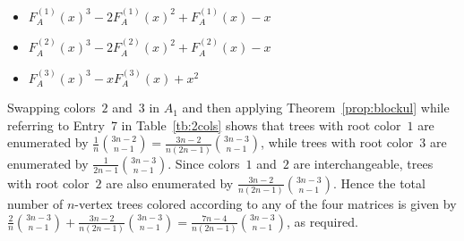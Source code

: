 \documentclass[12pt]{amsart}
\newcommand{\gff}[2]{F_{#2}^{(#1)}(x)}
\newcommand{\gfa}[1]{\gff{#1}{A}}
\begin{document}
\begin{description}
    \begin{itemize}
\item $\gfa{1}^3-2\gfa{1}^2+\gfa{1}-x$


\item $\gfa{2}^3-2\gfa{2}^2+\gfa{2}-x$


\item $\gfa{3}^3-x\gfa{3}+x^2$


\end{itemize}
    \item[Discussion] 
    Swapping colors~$2$ and~$3$ in $A_1$ and then applying Theorem~\ref{prop:blockul} while referring to Entry~7 in Table~\ref{tb:2cols} shows 
    that trees with root color~$1$ are enumerated by $\frac{1}{n}\binom{3n-2}{n-1}=\frac{3n-2}{n(2n-1)}\binom{3n-3}{n-1}$, while trees with root color~$3$ are enumerated by $\frac{1}{2n-1}\binom{3n-3}{n-1}$. Since colors~$1$ and~$2$ are interchangeable, trees with root color~$2$ are also enumerated by $\frac{3n-2}{n(2n-1)}\binom{3n-3}{n-1}$.
    Hence the total number of $n$-vertex trees colored according to any of the four matrices is given by $\frac{2}{n}\binom{3n-3}{n-1}+\frac{3n-2}{n(2n-1)}\binom{3n-3}{n-1}=\frac{7n-4}{n(2n-1)}\binom{3n-3}{n-1}$, as required.
\end{description}
\end{document}
